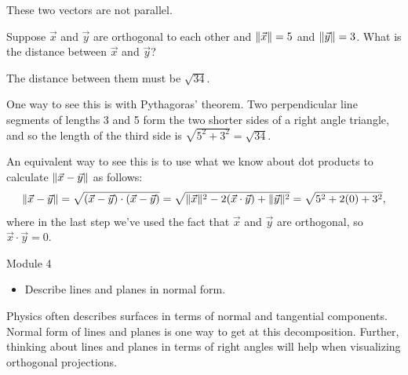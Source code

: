 \documentclass{workbook}
\begin{document}
\begin{slide}
\begin{parts}
\begin{solution}
				These two vectors are not parallel.
			\end{solution}
		\item Suppose $\vec x$ and $\vec y$ are orthogonal to each other and
			$\lVert\vec x\rVert=5$ and $\lVert\vec y\rVert=3$. What is the distance between
			$\vec x$ and $\vec y$?
			\begin{solution}
				The distance between them must be $\sqrt{34}$.

				One way to see this is with Pythagoras' theorem. Two perpendicular
				line segments of lengths 3 and 5 form the two shorter sides of a
				right angle triangle, and so the length of the third side is
				$\sqrt{5^2 + 3^2} = \sqrt{34}$.

				An equivalent way to see this is to use what we know about dot
				products to calculate $\lVert\vec x-\vec y\rVert$ as follows:
				\[
					\lVert\vec x-\vec y\rVert = \sqrt{(\vec x-\vec y)\cdot(\vec x-\vec y)}
					= \sqrt{\lVert\vec x\rVert^2 - 2(\vec x\cdot\vec y) + \lVert\vec y\rVert^2}
					= \sqrt{5^2 + 2(0) + 3^2},
				\]
				where in the last step we've used the fact that $\vec x$ and $\vec y$
				are orthogonal, so $\vec x\cdot\vec y = 0$.
			\end{solution}
	\end{parts}
\end{slide}
\begin{lesson}

	Module 4

	\begin{itemize}
		\item Describe lines and planes in normal form.
	\end{itemize}

	Physics often describes surfaces in terms of normal and tangential components.
	Normal form of lines and planes is one way to get at this decomposition. Further, thinking
	about lines and planes in terms of right angles will help when visualizing orthogonal projections.

\end{lesson}
\end{document}
